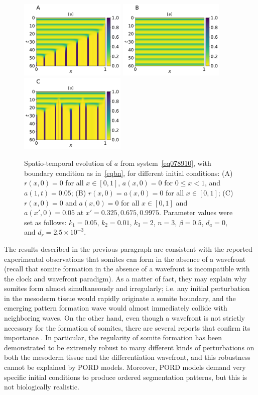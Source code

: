 \documentclass[11pt]{article}
\begin{document}
	\begin{figure}[t!]
		\centering
		\includegraphics[width=2in]{Figures/Fig02aRev.pdf}
		\includegraphics[width=2in]{Figures/Fig02bRev.pdf}
		\includegraphics[width=2in]{Figures/Fig02cRev.pdf}
		\caption{Spatio-temporal evolution of $a$ from system~\eqref{eq078910}, with
			boundary condition as in~\eqref{eqbn}, for different initial conditions: (A)
			$r(x, 0)=0$ for all $x\in[0,1]$, $a(x, 0)=0$ for $0\leq x<1$, and $a(1, t) =
			0.05$; (B) $r(x, 0) = a(x, 0)=0$ for all $x\in[0,1]$; (C) $r(x, 0)=0$ and $a(x,
			0)=0$ for all $x\in[0,1]$ and $a(x',0)=0.05$ at $x'=0.325, 0.675, 0.9975$.
			Parameter values were set as follows: $k_1=0.05$, $k_2=0.01$, $k_3=2$, $n=3$,
			$\beta=0.5$, $d_a=0$, and $d_r=2.5\times10^{-3}$.}
		\label{Fig02}
	\end{figure}
	
	The results described in the previous paragraph are consistent with the reported
	experimental observations that somites can form in the absence of a wavefront
	(recall that somite formation 
	in the absence of a wavefront is incompatible with the clock and wavefront paradigm).
	As a matter of fact, they may explain why somites form almost simultaneously and
	irregularly; i.e. any initial perturbation in the mesoderm tissue would
	rapidly originate a somite boundary, and the emerging pattern formation wave would
	almost immediately collide with neighboring waves. 
	On the other hand, even though a wavefront is not strictly necessary for the 
	formation of somites, there are several reports that confirm its importance
	\citep{Sawada2001, Naiche2011} . In particular, the regularity of somite
	formation has been demonstrated to be extremely robust to many different kinds
	of perturbations on both the mesoderm tissue and the differentiation wavefront,
	and this robustness cannot be explained by PORD models. Moreover, PORD 
	models demand very specific initial conditions to produce ordered 
	segmentation patterns, but this is not biologically realistic.
	
\end{document}
